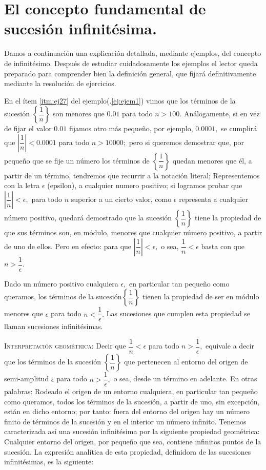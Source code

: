 \documentclass[oneside,english,spanish,2m,twoside,svgnames,x11names,HTML,twoside,12pt]{libro-matua}\usepackage[]{graphicx}\usepackage[]{color}
\newcommand{\noun}[1]{\textsc{#1}}
\def\myref#1{\textcolor{ptctitle}{\thesection .\ref{#1}}}
\newcommand{\val}[1]{\left|#1\right|}
\begin{document}
\section{El concepto fundamental de sucesión infinitésima.}

\intro 

Damos a continuación una explicación detallada, mediante ejemplos,
del concepto de infinitésimo. Después de estudiar cuidadosamente los
ejemplos el lector queda preparado para comprender bien la definición
general, que fijará definitivamente mediante la resolución de ejercicios.

\begin{ejemplo}\label{ej:ejem2.1}

En el ítem \ref{itm:ej27} del ejemplo(\myref{ej:ejem1}) vimos que
los términos de la sucesión $\left\{ \dfrac{1}{n}\right\} $ son menores
que $0.01$ para todo $n>100.$ Análogamente, si en vez de fijar el
valor $0.01$ fijamos otro más pequeño, por ejemplo, $0.0001,$ se
cumplirá que $\val{\dfrac{1}{n}}<0.0001$ para todo $n>10000;$ pero
si queremos demostrar que, por pequeño que se fije un número los términos
de $\left\{ \dfrac{1}{n}\right\} $ quedan menores que él, a partir
de un término, tendremos que recurrir a la notación literal; Representemos
con la letra $\epsilon$ (epsilon), a cualquier numero positivo; si
logramos probar que $\val{\dfrac{1}{n}}<\epsilon,$ para todo $n$
superior a un cierto valor, como $\epsilon$ representa a cualquier
número positivo, quedará demostrado que la sucesión $\left\{ \dfrac{1}{n}\right\} $
tiene la propiedad de que sus términos son, en módulo, menores que
cualquier número positivo, a partir de uno de ellos. Pero en efecto:
para que $\val{\dfrac{1}{n}}<\epsilon,$ o sea, $\dfrac{1}{n}<\epsilon$
basta con que $n>\dfrac{1}{\epsilon}.$\linebreak{}
\end{ejemplo}

\conclu Dado un número positivo cualquiera $\epsilon,$ en particular
tan pequeño como queramos, los términos de la sucesión$\left\{ \dfrac{1}{n}\right\} $
tienen la propiedad de ser en módulo menores que $\epsilon$ para
todo $n<\dfrac{1}{\epsilon}.$ Las sucesiones que cumplen esta propiedad
se llaman sucesiones infinitésimas.

\noun{Interpretación geométrica}: Decir que $\dfrac{1}{n}<\epsilon$
para todo $n>\dfrac{1}{\epsilon},$ equivale a decir que los términos
de la sucesión $\left\{ \dfrac{1}{n}\right\} $ que pertenecen al
entorno del origen de semi-amplitud $\epsilon$ para todo $n>\dfrac{1}{\epsilon},$
o sea, desde un término en adelante. En otras palabras: Rodeado el
origen de un entorno cualquiera, en particular tan pequeño como queramos,
todos los términos de la sucesión, a partir de uno, sin excepción,
están en dicho entorno; por tanto: fuera del entorno del origen hay
un número finito de términos de la sucesión y en el interior un número
infinito. Tenemos caracterizada así una sucesión infinitésima por
la siguiente propiedad geométrica: Cualquier entorno del origen, por
pequeño que sea, contiene infinitos puntos de la sucesión. La expresión
analítica de esta propiedad, definidora de las sucesiones infinitésimas,
es la siguiente: 
\end{document}
